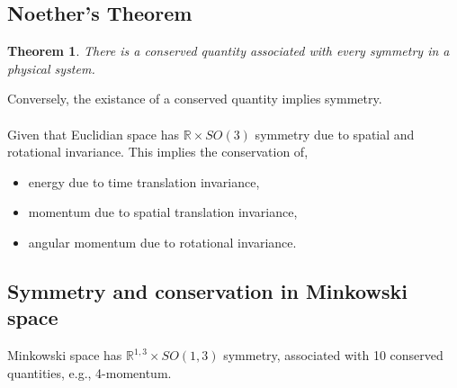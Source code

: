 \documentclass{book}
\newtheorem*{theorem}{Theorem}
\begin{document}
\subsection{Noether's Theorem}
\begin{theorem}
	There is a conserved quantity associated with every symmetry in a physical system.
\end{theorem}
Conversely, the existance of a conserved quantity implies symmetry.
\\\\
Given that Euclidian space has $\mathbb{R} \times SO(3)$ symmetry due to spatial and rotational invariance. This implies the conservation of,
\begin{itemize}
	\item energy due to time translation invariance,
	\item momentum due to spatial translation invariance,
	\item angular momentum due to rotational invariance.
\end{itemize}
\subsection{Symmetry and conservation in Minkowski space}
Minkowski space has $\mathbb{R}^{1,3}\times SO(1,3)$ symmetry, associated with 10 conserved quantities, e.g., 4-momentum.
\end{document}
